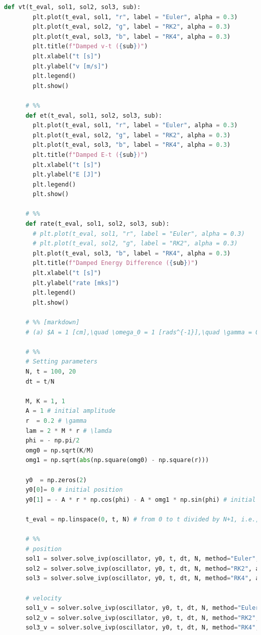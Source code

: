 \documentclass[12pt]{article}
\begin{document}
\begin{lstlisting}[language={Python}]
      def vt(t_eval, sol1, sol2, sol3, sub):
        plt.plot(t_eval, sol1, "r", label = "Euler", alpha = 0.3)
        plt.plot(t_eval, sol2, "g", label = "RK2", alpha = 0.3)
        plt.plot(t_eval, sol3, "b", label = "RK4", alpha = 0.3)
        plt.title(f"Damped v-t ({sub})")
        plt.xlabel("t [s]")
        plt.ylabel("v [m/s]")
        plt.legend()
        plt.show()

      # %%
      def et(t_eval, sol1, sol2, sol3, sub):
        plt.plot(t_eval, sol1, "r", label = "Euler", alpha = 0.3)
        plt.plot(t_eval, sol2, "g", label = "RK2", alpha = 0.3)
        plt.plot(t_eval, sol3, "b", label = "RK4", alpha = 0.3)
        plt.title(f"Damped E-t ({sub})")
        plt.xlabel("t [s]")
        plt.ylabel("E [J]")
        plt.legend()
        plt.show()

      # %%
      def rate(t_eval, sol1, sol2, sol3, sub):
        # plt.plot(t_eval, sol1, "r", label = "Euler", alpha = 0.3)
        # plt.plot(t_eval, sol2, "g", label = "RK2", alpha = 0.3)
        plt.plot(t_eval, sol3, "b", label = "RK4", alpha = 0.3)
        plt.title(f"Damped Energy Difference ({sub})")
        plt.xlabel("t [s]")
        plt.ylabel("rate [mks]")
        plt.legend()
        plt.show()

      # %% [markdown]
      # (a) $A = 1 [cm],\quad \omega_0 = 1 [rads^{-1}],\quad \gamma = 0.2 [s^{-1}], \quad \phi = -\pi / 2 [rad]$

      # %%
      # Setting parameters
      N, t = 100, 20
      dt = t/N

      M, K = 1, 1
      A = 1 # initial amplitude
      r  = 0.2 # \gamma
      lam = 2 * M * r # \lamda
      phi = - np.pi/2
      omg0 = np.sqrt(K/M)
      omg1 = np.sqrt(abs(np.square(omg0) - np.square(r)))

      y0  = np.zeros(2)
      y0[0]= 0 # initial position
      y0[1] = - A * r * np.cos(phi) - A * omg1 * np.sin(phi) # initial velocity

      t_eval = np.linspace(0, t, N) # from 0 to t divided by N+1, i.e., N+1 equal parts.

      # %%
      # position
      sol1 = solver.solve_ivp(oscillator, y0, t, dt, N, method="Euler", args=(lam, K, M))[0]
      sol2 = solver.solve_ivp(oscillator, y0, t, dt, N, method="RK2", args=(lam, K, M))[0]
      sol3 = solver.solve_ivp(oscillator, y0, t, dt, N, method="RK4", args=(lam, K, M))[0]

      # velocity
      sol1_v = solver.solve_ivp(oscillator, y0, t, dt, N, method="Euler", args=(lam, K, M))[1]
      sol2_v = solver.solve_ivp(oscillator, y0, t, dt, N, method="RK2", args=(lam, K, M))[1]
      sol3_v = solver.solve_ivp(oscillator, y0, t, dt, N, method="RK4", args=(lam, K, M))[1]


\end{lstlisting}
\end{document}
